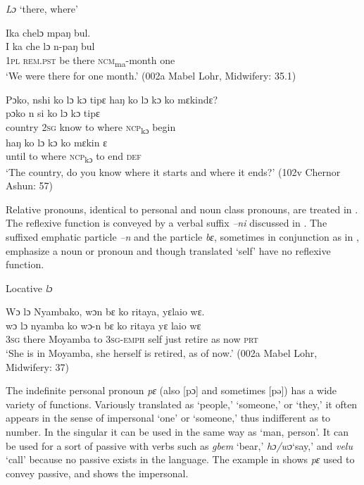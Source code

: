 \ea%
    \label{ex:67}
   \textit{Lɔ} ‘there, where'

  \ea \label{ex:67a} Ika chelɔ mpaŋ bul.\\
  \gll I    ka      che  lɔ    n-paŋ        bul\\
  \textsc{1pl}  \textsc{rem.pst}  be    there  \textsc{ncm}\textsubscript{ma}{}-month  one\\
  \glt ‘We were there for one month.' (002a Mabel Lohr, Midwifery: 35.1)

  \ex \label{ex:67b} Pɔko, nshi ko lɔ kɔ tipɛ haŋ ko lɔ kɔ ko mɛkindɛ?\\
  \gll pɔko    n    si      ko    lɔ      kɔ      tipɛ\\
  country  \textsc{2sg}  know    to    where  \textsc{ncp}\textsubscript{kɔ}    begin\\
  \gll haŋ  ko    lɔ      kɔ      ko    mɛkin  ɛ\\
  until  to    where  \textsc{ncp}\textsubscript{kɔ}    to    end    \textsc{def}\\
  \glt ‘The country, do you know where it starts and where it ends?' (102v Chernor Ashun: 57)
\z
\z

Relative pronouns, identical to personal and noun class pronouns, are treated in . The reflexive function is conveyed by a verbal suffix \textit{–ni} discussed in . The suffixed emphatic particle \textit{–n} and the particle \textit{bɛ}, sometimes in conjunction as in , emphasize a noun or pronoun and though translated ‘self' have no reflexive function.

\ea%
  \label{ex:68} Locative \textit{lɔ}
  
  Wɔ lɔ Nyambako, wɔn bɛ ko ritaya, yɛlaio wɛ.\\
  \gll wɔ    lɔ    nyamba    ko    wɔ{}-n      bɛ    ko    ritaya    yɛ  laio  wɛ\\
\textsc{3sg}  there  Moyamba  to    \textsc{3sg}{}-\textsc{emph}  self  just  retire    as  now  \textsc{prt}\\
\glt ‘She is in Moyamba, she herself is retired, as of now.' (002a Mabel Lohr, Midwifery: 37)
\z

The indefinite personal pronoun \textit{pɛ} (also [pɔ] and sometimes [pǝ]) has a wide variety of functions. Variously translated as ‘people,' ‘someone,' or ‘they,' it often appears in the sense of impersonal ‘one' or ‘someone,' thus indifferent as to number. In the singular it can be used in the same way as ‘man, person'. It can be used for a sort of passive with verbs such as \textit{gbem} ‘bear,' \textit{hɔ/wɔ}‘say,' and \textit{velu} ‘call' because no passive exists in the language. The example in   shows \textit{pɛ} used to convey passive, and  shows the impersonal.

